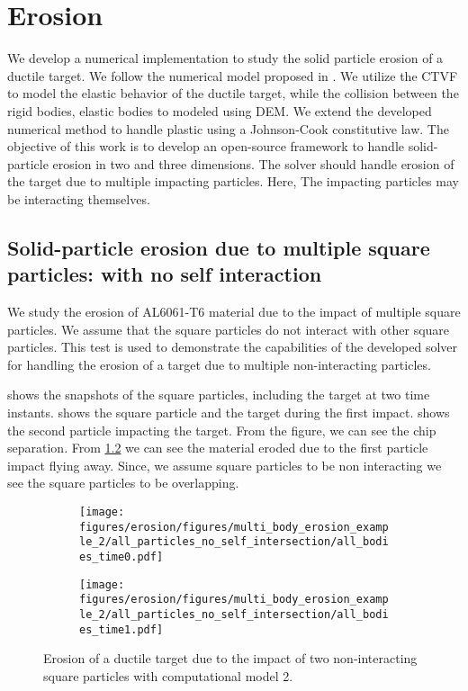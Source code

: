 \FloatBarrier%
\chapter{Erosion}
\label{chap:erosion}
We develop a numerical implementation to study the solid particle erosion of a
ductile target. We follow the numerical model proposed in
\citep{dong2016smoothed}. We utilize the CTVF to model the elastic behavior of
the ductile target, while the collision between the rigid bodies, elastic bodies
to modeled using DEM. We extend the developed numerical method to handle plastic
using a Johnson-Cook constitutive law. The objective of this work is to develop
an open-source framework to handle solid-particle erosion in two and three
dimensions. The solver should handle erosion of the target due to multiple
impacting particles. Here, The impacting particles may be interacting
themselves.


\FloatBarrier%
\section{Solid-particle erosion due to multiple square particles: with no self
  interaction}
\label{sec:res:mpe-2}
We study the erosion of AL6061-T6 material due to the impact of multiple square
particles. We assume that the square particles do not interact with other square
particles. This test is used to demonstrate the capabilities of the developed
solver for handling the erosion of a target due to multiple non-interacting
particles.

 shows the snapshots of the square particles, including the
target at two time instants.  shows the square particle
and the target during the first impact.  shows the second
particle impacting the target. From the figure, we can see the chip separation.
From \cref{fig:mpe-2-full-b} we can see the material eroded due to the first
particle impact flying away. Since, we assume square particles to be non interacting
we see the square particles to be overlapping.
\begin{figure}[!htpb]
  \centering
  \begin{subfigure}{0.48\textwidth}
    \centering
    \texttt{[image: figures/erosion/figures/multi\_body\_erosion\_example\_2/all\_particles\_no\_self\_intersection/all\_bodies\_time0.pdf]}
    \subcaption{}
    \label{fig:mpe-2-full-a}
  \end{subfigure}
  \begin{subfigure}{0.48\textwidth}
    \centering
    \texttt{[image: figures/erosion/figures/multi\_body\_erosion\_example\_2/all\_particles\_no\_self\_intersection/all\_bodies\_time1.pdf]}
    \subcaption{}
    \label{fig:mpe-2-full-b}
  \end{subfigure}
  \caption{Erosion of a ductile target due to the impact of two non-interacting
    square particles with computational model 2.}
\label{fig:mpe-2-full}
\end{figure}




